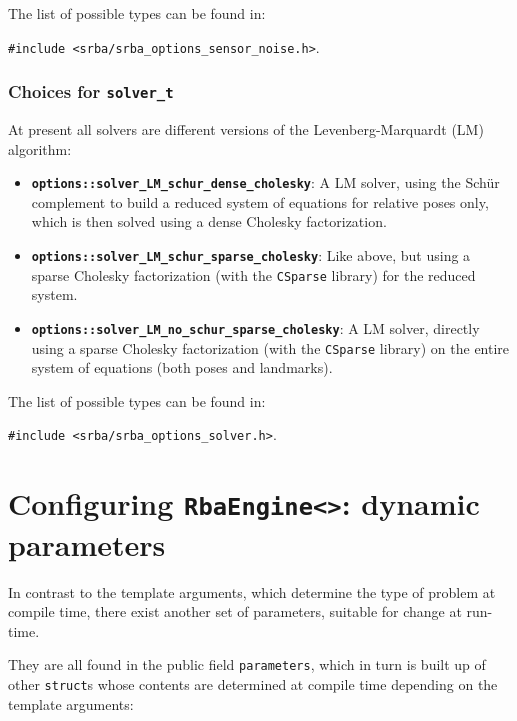 \documentclass[a4paper,11pt]{article}
\begin{document}
The list of possible types can be found in: 

\texttt{\#include <srba/srba\_options\_sensor\_noise.h>}.


\subsubsection{Choices for \texttt{solver\_t}}
\label{sect:choices.solvers}

At present all solvers are different versions of the Levenberg-Marquardt (LM) algorithm:

\begin{itemize}
\item{\textbf{ \texttt{options::solver\_LM\_schur\_dense\_cholesky}}: A LM solver, 
using the Sch\"ur complement to build a reduced system of equations for relative poses only, 
which is then solved using a dense Cholesky factorization.}

\item{\textbf{ \texttt{options::solver\_LM\_schur\_sparse\_cholesky}}: Like above, but 
using a sparse Cholesky factorization (with the \texttt{CSparse} library) for the reduced system.}

\item{\textbf{ \texttt{options::solver\_LM\_no\_schur\_sparse\_cholesky}}: A LM solver,
directly using a sparse Cholesky factorization (with the \texttt{CSparse} library) on 
the entire system of equations (both poses and landmarks).}

\end{itemize}

The list of possible types can be found in: 

\texttt{\#include <srba/srba\_options\_solver.h>}.


\section{Configuring \texttt{RbaEngine<>}: dynamic parameters}
\label{sect:rba_dyn_parameters}

In contrast to the template arguments, which determine the type of problem at compile time, 
there exist another set of parameters, suitable for change at run-time.

They are all found in the public field \texttt{parameters}, which 
in turn is built up of other \texttt{struct}s whose contents are determined
at compile time depending on the template arguments:
\end{document}

